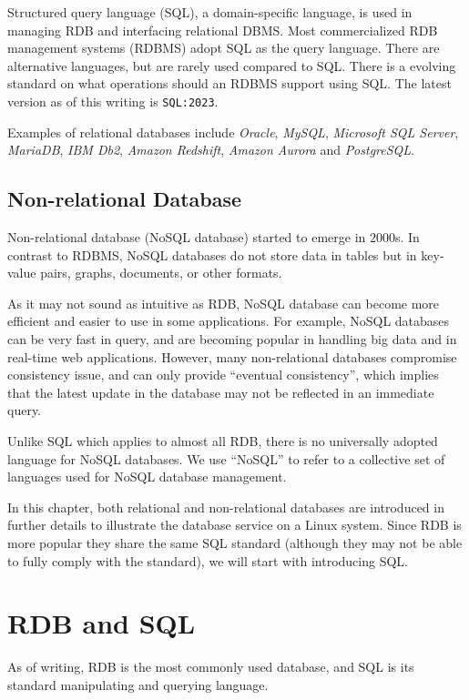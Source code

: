 Structured query language (SQL), a domain-specific language, is used in managing RDB and interfacing relational DBMS.  Most commercialized RDB management systems (RDBMS) adopt SQL as the query language. There are alternative languages, but are rarely used compared to SQL. There is a evolving standard on what operations should an RDBMS support using SQL. The latest version as of this writing is \verb|SQL:2023|.

Examples of relational databases include \textit{Oracle}, \textit{MySQL}, \textit{Microsoft SQL Server}, \textit{MariaDB}, \textit{IBM Db2}, \textit{Amazon Redshift}, \textit{Amazon Aurora} and \textit{PostgreSQL}.

\subsection{Non-relational Database}

Non-relational database (NoSQL database) started to emerge in $2000$s. In contrast to RDBMS, NoSQL databases do not store data in tables but in key-value pairs, graphs, documents, or other formats.

As it may not sound as intuitive as RDB, NoSQL database can become more efficient and easier to use in some applications. For example, NoSQL databases can be very fast in query, and are becoming popular in handling big data and in real-time web applications. However, many non-relational databases compromise consistency issue, and can only provide ``eventual consistency'', which implies that the latest update in the database may not be reflected in an immediate query.

Unlike SQL which applies to almost all RDB, there is no universally adopted language for NoSQL databases. We use ``NoSQL'' to refer to a collective set of languages used for NoSQL database management.

In this chapter, both relational and non-relational databases are introduced in further details to illustrate the database service on a Linux system. Since RDB is more popular they share the same SQL standard (although they may not be able to fully comply with the standard), we will start with introducing SQL.

\section{RDB and SQL}

As of writing, RDB is the most commonly used database, and SQL is its standard manipulating and querying language.


